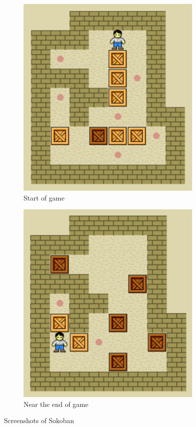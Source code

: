 \documentclass[10pt, notitlepage]{article}
\begin{document}
\begin{figure}[ht]
\centering
\begin{subfigure}{.22\textwidth}
  \centering
  \includegraphics[width=.8\linewidth]{images/sokoban1.png}
  \caption{Start of game}
  \label{fig:sub1}
\end{subfigure}%
\begin{subfigure}{.22\textwidth}
  \centering
  \includegraphics[width=.8\linewidth]{images/sokoban2.png}
  \caption{Near the end of game}
  \label{fig:sub2}
\end{subfigure}
\caption{Screenshots of Sokoban}
\label{fig:test}
\end{figure}

\printbibliography
\end{document}
